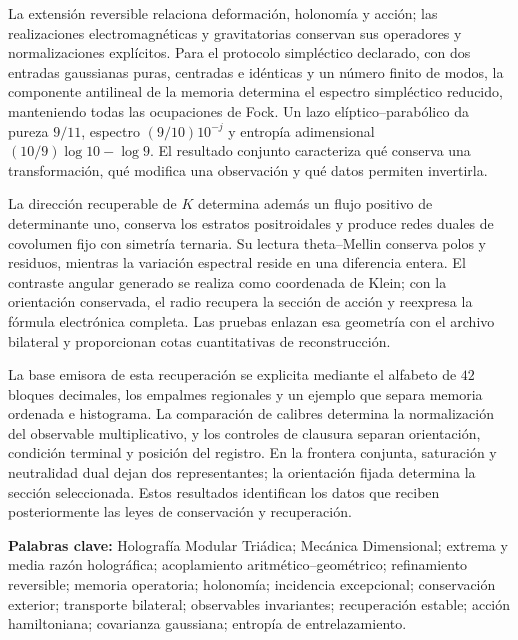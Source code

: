 La extensión reversible relaciona deformación, holonomía y acción; las realizaciones electromagnéticas y gravitatorias conservan sus operadores y normalizaciones explícitos. Para el protocolo simpléctico declarado, con dos entradas gaussianas puras, centradas e idénticas y un número finito de modos, la componente antilineal de la memoria determina el espectro simpléctico reducido, manteniendo todas las ocupaciones de Fock. Un lazo elíptico--parabólico da pureza \(9/11\), espectro \((9/10)10^{-j}\) y entropía adimensional \((10/9)\log10-\log9\). El resultado conjunto caracteriza qué conserva una transformación, qué modifica una observación y qué datos permiten invertirla.

\medskip
La dirección recuperable de \(K\) determina además un flujo positivo de determinante uno, conserva los estratos positroidales y produce redes duales de covolumen fijo con simetría ternaria. Su lectura theta--Mellin conserva polos y residuos, mientras la variación espectral reside en una diferencia entera. El contraste angular generado se realiza como coordenada de Klein; con la orientación conservada, el radio recupera la sección de acción y reexpresa la fórmula electrónica completa. Las pruebas enlazan esa geometría con el archivo bilateral y proporcionan cotas cuantitativas de reconstrucción.


La base emisora de esta recuperación se explicita mediante el alfabeto
de \(42\) bloques decimales, los empalmes regionales y un ejemplo que
separa memoria ordenada e histograma. La comparación de calibres
determina la normalización del observable multiplicativo, y los controles
de clausura separan orientación, condición terminal y posición del registro.
En la frontera conjunta, saturación y neutralidad dual dejan dos
representantes; la orientación fijada determina la sección seleccionada.
Estos resultados identifican los datos que reciben posteriormente
las leyes de conservación y recuperación.

\noindent\textbf{Palabras clave:} Holografía Modular Triádica; Mecánica Dimensional; extrema y media razón holográfica; acoplamiento aritmético--geométrico; refinamiento reversible; memoria operatoria; holonomía; incidencia excepcional; conservación exterior; transporte bilateral; observables invariantes; recuperación estable; acción hamiltoniana; covarianza gaussiana; entropía de entrelazamiento.

